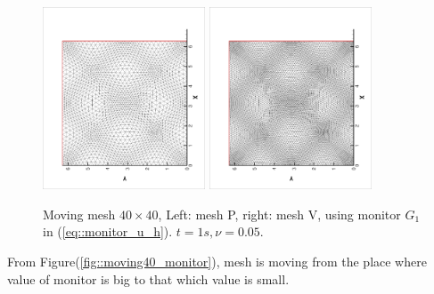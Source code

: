 \documentclass{article}
\begin{document}
 \begin{figure}[ht]
   \centering
   \includegraphics[width = 0.43\textwidth, angle = -90]{./moving40_meshP.eps}
   \includegraphics[width = 0.43\textwidth, angle = -90]{./moving40_meshV.eps}
   \caption{\small Moving mesh $40 \times 40$,
     Left: mesh P, right: mesh V, using monitor $G_1$
     in (\ref{eq::monitor_u_h}). $t = 1s, \nu = 0.05$.}
   \label{fig::moving40_mesh}
 \end{figure}

 From Figure(\ref{fig::moving40_monitor}), mesh is moving from the
 place where value of monitor is big to that which value is small.
 
\end{document}
